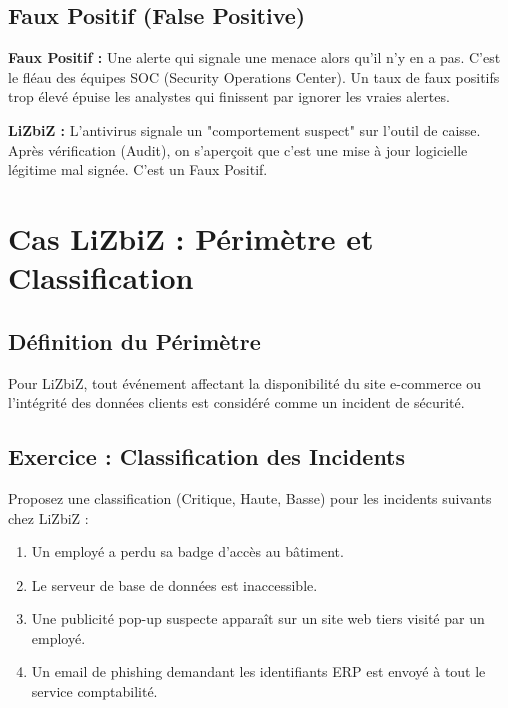 \subsection{Faux Positif (False Positive)}

\begin{boxdef}
\textbf{Faux Positif :} Une alerte qui signale une menace alors qu'il n'y en a pas. C'est le fléau des équipes SOC (Security Operations Center). Un taux de faux positifs trop élevé épuise les analystes qui finissent par ignorer les vraies alertes.
\end{boxdef}

\begin{boxlizbiz}
\textbf{LiZbiZ :} L'antivirus signale un "comportement suspect" sur l'outil de caisse. Après vérification (Audit), on s'aperçoit que c'est une mise à jour logicielle légitime mal signée. C'est un Faux Positif.
\end{boxlizbiz}

\section{Cas LiZbiZ : Périmètre et Classification}

\subsection{Définition du Périmètre}

Pour LiZbiZ, tout événement affectant la disponibilité du site e-commerce ou l'intégrité des données clients est considéré comme un incident de sécurité.

\subsection{Exercice : Classification des Incidents}

Proposez une classification (Critique, Haute, Basse) pour les incidents suivants chez LiZbiZ :

\begin{enumerate}
    \item Un employé a perdu sa badge d'accès au bâtiment.
    \item Le serveur de base de données est inaccessible.
    \item Une publicité pop-up suspecte apparaît sur un site web tiers visité par un employé.
    \item Un email de phishing demandant les identifiants ERP est envoyé à tout le service comptabilité.
\end{enumerate}

